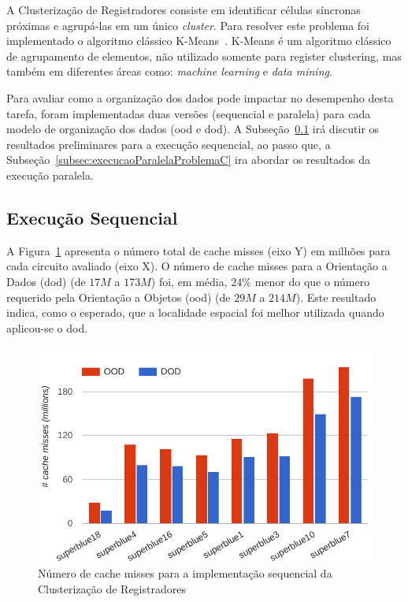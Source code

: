 A Clusterização de Registradores consiste em identificar células síncronas próximas e agrupá-las em um único \textit{cluster}. Para resolver este problema foi implementado o algoritmo clássico K-Means~\cite{selim1984k}. K-Means é um algoritmo clássico de agrupamento de elementos, não utilizado somente para register clustering, mas também em diferentes áreas como: \textit{machine learning} e \textit{data mining}.

Para avaliar como a organização dos dados pode impactar no desempenho desta tarefa, foram implementadas duas versões (sequencial e paralela) para cada modelo de organização dos dados (\ac{ood} e \ac{dod}).
A Subseção~\ref{subsec:execucaoSequencialProblemaC} irá discutir os resultados preliminares para a execução sequencial, ao passo que, a Subseção~\ref{subsec:execucaoParalelaProblemaC} ira abordar os resultados da execução paralela.

\subsection{Execução Sequencial}
\label{subsec:execucaoSequencialProblemaC}

A Figura~\ref{fig:missProblemC_sequential_rtree} apresenta o número total de cache misses (eixo Y) em milhões para cada circuito avaliado (eixo X).
O número de cache misses para a Orientação a Dados (\ac{dod}) (de $17M$ a $173M$) foi, em média, $24\%$ menor do que o número requerido pela Orientação a Objetos (\ac{ood}) (de $29M$ a $214M$).
Este resultado indica, como o esperado, que a localidade espacial foi melhor utilizada quando aplicou-se o \ac{dod}.

\begin{figure}[ht]
    \centering
    \includegraphics[width=0.7\linewidth]{img/results/missProblemC_sequential_rtree}
    \caption[Cache misses Problema~C versão sequencial]{Número de cache misses para a implementação sequencial da Clusterização de Registradores}
    \label{fig:missProblemC_sequential_rtree}
\end{figure}

